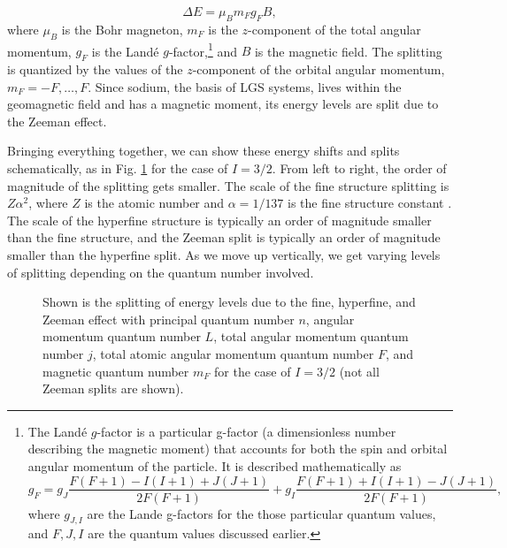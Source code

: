 \begin{equation}
  \Delta E = \mu_B m_F g_F B,
  \label{zeeman}
\end{equation}
%
where $\mu_B$ is the Bohr magneton, $m_F$ is the $z$-component of the total angular momentum, $g_F$ is the Land\'{e} $g$-factor,\footnote{The Land\'{e} $g$-factor is a particular g-factor (a dimensionless number describing the magnetic moment) that accounts for both the spin and orbital angular momentum of the particle. It is described mathematically as 
  \begin{equation}
	g_F = g_J \frac{F(F+1) -I(I+1) + J(J+1)}{2F(F+1)} + g_I \frac{F(F+1) + I(I+1) -J(J+1)}{2F(F+1)},
	\label{lande}
  \end{equation}
%
where $g_{J,I}$ are the Lande g-factors for the those particular quantum values, and $F,J,I$ are the quantum values discussed earlier.} and $B$ is the magnetic field. The splitting is quantized by the values of the $z$-component of the orbital angular momentum, $m_F = -F, \dots, F$. Since sodium, the basis of LGS systems, lives within the geomagnetic field and has a magnetic moment, its energy levels are split due to the Zeeman effect.

Bringing everything together, we can show these energy shifts and splits schematically, as in Fig. \ref{fig:energysplitting} for the case of $I = 3/2$. From left to right, the order of magnitude of the splitting gets smaller. The scale of the fine structure splitting is $Z \alpha^2$, where $Z$ is the atomic number and $\alpha = 1/137$ is the fine structure constant \cite{feynman}. The scale of the hyperfine structure is typically an order of magnitude smaller than the fine structure, and the Zeeman split is typically an order of magnitude smaller than the hyperfine split. As we move up vertically, we get varying levels of splitting depending on the quantum number involved. 

\begin{figure}[ht]
	\centering
	
	\caption{Shown is the  splitting of energy levels due to the fine, hyperfine, and Zeeman effect with principal quantum number $n$, angular momentum quantum number $L$, total angular momentum quantum number $j$, total atomic angular momentum quantum number $F$, and magnetic quantum number $m_F$ for the case of $I = 3/2$ (not all Zeeman splits are shown).}
  \label{fig:energysplitting}
\end{figure}




